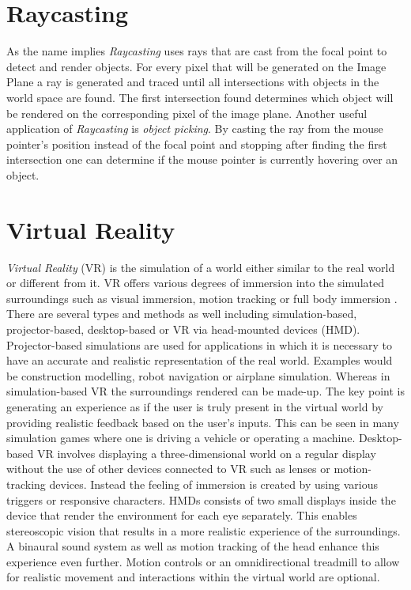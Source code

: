 \section{Raycasting}
\label{sec:visualconcepts:raycasting}

As the name implies \textit{Raycasting} uses rays that are cast from the focal point to detect and render objects. For every pixel that will be generated on the Image Plane a ray is generated and traced until all intersections with objects in the world space are found. The first intersection found determines which object will be rendered on the corresponding pixel of the image plane. Another useful application of \textit{Raycasting} is \textit{object picking}. By casting the ray from the mouse pointer's position instead of the focal point and stopping after finding the first intersection one can determine if the mouse pointer is currently hovering over an object.

\section{Virtual Reality}
\label{sec:visualconcepts:virtualreality}

\textit{Virtual Reality} (VR) is the simulation of a world either similar to the real world or different from it. VR offers various degrees of immersion into the simulated surroundings such as visual immersion, motion tracking or full body immersion \cite{10.3389/fpsyg.2018.02086}. There are several types and methods as well including simulation-based, projector-based, desktop-based or VR via head-mounted devices (HMD). Projector-based simulations are used for applications in which it is necessary to have an accurate and realistic representation of the real world. Examples would be construction modelling, robot navigation or airplane simulation. Whereas in simulation-based VR the surroundings rendered can be made-up.  The key point is generating an experience as if the user is truly present in the virtual world by providing realistic feedback based on the user's inputs. This can be seen in many simulation games where one is driving a vehicle or operating a machine. Desktop-based VR involves displaying a three-dimensional world on a regular display without the use of other devices connected to VR such as lenses or motion-tracking devices. Instead the feeling of immersion is created by using various triggers or responsive characters. HMDs consists of two small displays inside the device that render the environment for each eye separately. This enables stereoscopic vision that results in a more realistic experience of the surroundings. A binaural sound system as well as motion tracking of the head enhance this experience even further. Motion controls or an omnidirectional treadmill to allow for realistic movement and interactions within the virtual world are optional.

